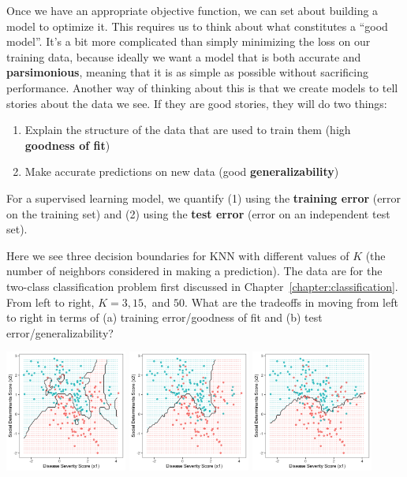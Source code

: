 Once we have an appropriate objective function, we can set about building a model to optimize it. This requires us to think about what constitutes a ``good model''. It's a bit more complicated than simply minimizing the loss on our training data, because ideally we want a model that is both accurate and \textbf{parsimonious}, meaning that it is as simple as possible without sacrificing performance. Another way of thinking about this is that we create models to tell stories about the data we see. If they are good stories, they will do two things:
\begin{enumerate}
\item Explain the structure of the data that are used to train them (high \textbf{goodness of fit})
\item Make accurate predictions on new data (good \textbf{generalizability}) 
\end{enumerate}
For a supervised learning model, we quantify (1) using the \textbf{training error} (error on the training set) and (2) using the \textbf{test error} (error on an independent test set).

\vspace{2mm}

\begin{question}{}
Here we see three decision boundaries for KNN with different values of $K$ (the number of neighbors considered in making a prediction). The data are for the two-class classification problem first discussed in Chapter~\ref{chapter:classification}. From left to right, $K=3, 15,$ and $50$. What are the tradeoffs in moving from left to right in terms of (a) training error/goodness of fit and (b) test error/generalizability? 
\begin{center}
\includegraphics[width=0.3\textwidth]{img/esl-knn-3.png}
\includegraphics[width=0.3\textwidth]{img/esl-knn-15.png}
\includegraphics[width=0.3\textwidth]{img/esl-knn-50.png}
\end{center}
\end{question}

